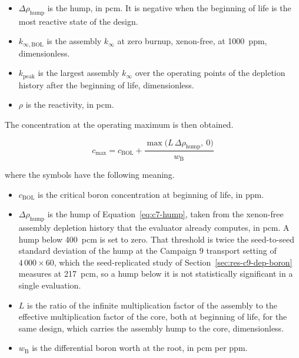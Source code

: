 \begin{itemize}
  \item $\Delta\rho_\mathrm{hump}$ is the hump, in pcm. It is negative
        when the beginning of life is the most reactive state of the design.

  \item $k_{\infty,\mathrm{BOL}}$ is the assembly $k_\infty$ at zero burnup,
        xenon-free, at \SI{1000}{ppm}, dimensionless.

  \item $k_\mathrm{peak}$ is the largest assembly $k_\infty$ over the
        operating points of the depletion history after the beginning of
        life, dimensionless.

  \item $\rho$ is the reactivity, in pcm.
\end{itemize}

The concentration at the operating maximum is then obtained.

\begin{equation}
c_\mathrm{max} = c_\mathrm{BOL} + \frac{\max\!\big(L\,\Delta\rho_\mathrm{hump},\ 0\big)}{w_\mathrm{B}}
\label{eq:c9-cmax}
\end{equation}

\noindent where the symbols have the following meaning.

\begin{itemize}
  \item $c_\mathrm{BOL}$ is the critical boron concentration at
        beginning of life, in ppm.

  \item $\Delta\rho_\mathrm{hump}$ is the hump of
        Equation~\eqref{eq:c7-hump}, taken from the xenon-free assembly
        depletion history that the evaluator already computes, in pcm.
        A hump below \SI{400}{pcm} is set to zero. That threshold is twice
        the seed-to-seed standard deviation of the hump at the
        Campaign 9 transport setting of $4\,000\times60$, which the
        seed-replicated study of
        Section~\ref{sec:res-c9-dep-boron} measures at \SI{217}{pcm}, so a hump below it is not statistically significant in a single
        evaluation.

  \item $L$ is the ratio of the infinite multiplication factor of the assembly to the effective multiplication factor of the core, both at beginning of life, for the same design, which carries the assembly hump
        to the core, dimensionless.

  \item $w_\mathrm{B}$ is the differential boron worth at the root, in
        pcm per ppm.
\end{itemize}


